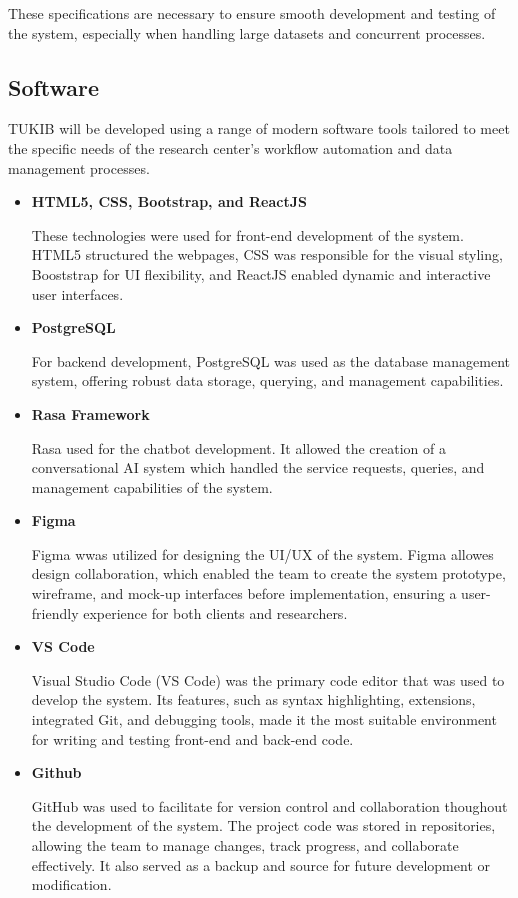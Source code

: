 These specifications are necessary to ensure smooth development and testing of the system, especially when handling large datasets and concurrent processes.

\subsection{Software}

TUKIB will be developed using a range of modern software tools tailored to meet the specific needs of the research center’s workflow automation and data management processes.

\begin{itemize}
	\item \textbf{HTML5, CSS, Bootstrap, and ReactJS}
	
	These technologies were used for front-end development of the system. HTML5 structured the webpages, CSS was responsible for the visual styling, Booststrap for UI $ $flexibility, and ReactJS enabled dynamic and interactive user interfaces.
	
	\item \textbf{PostgreSQL}
	
	For backend development, PostgreSQL was used as the database management system, offering robust data storage, querying, and management capabilities.
	
	\item \textbf{Rasa Framework}
	
	Rasa used for the chatbot development. It allowed the creation of a conversational AI system which handled the service requests, queries, and management capabilities of the system.
	
	\item \textbf{Figma}
	
	Figma wwas utilized for designing the UI/UX of the system. Figma allowes design collaboration, which enabled the team to create the system prototype, wireframe, and mock-up interfaces before implementation, ensuring a user-friendly experience for both clients and researchers.
	
	\item \textbf{VS Code}
	
	Visual Studio Code (VS Code) was the primary code editor that was used to develop the system. Its features, such as syntax highlighting, extensions, integrated Git, and debugging tools, made it the most suitable environment for writing and testing front-end and back-end code.
	
	\item \textbf{Github}
	
	GitHub was used to facilitate for version control and collaboration thoughout the development of the system. The project code was stored in repositories, allowing the team to manage changes, track progress, and collaborate effectively. It also served as a backup and source for future development or modification.
	
\end{itemize}
